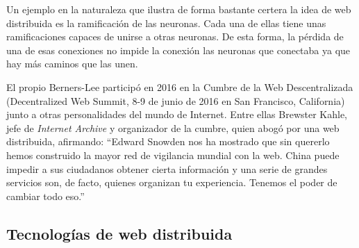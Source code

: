 \documentclass[12pt]{article} %
\begin{document}
Un ejemplo en la naturaleza que ilustra de forma bastante certera la idea de web distribuida es la ramificación de las neuronas. Cada una de ellas tiene unas ramificaciones capaces de unirse a otras neuronas. De esta forma, la pérdida de una de esas conexiones no impide la conexión las neuronas que conectaba ya que hay más caminos que las unen.

El propio Berners-Lee participó en 2016 en la Cumbre de la Web Descentralizada (Decentralized Web Summit, 8-9 de junio de 2016 en San Francisco, California)\cite{decentralized-web-summit} junto a otras personalidades del mundo de Internet. Entre ellas Brewster Kahle, jefe de \textit{Internet Archive} y organizador de la cumbre, quien abogó por una web distribuida, afirmando: ``Edward Snowden nos ha mostrado que sin quererlo hemos construido la mayor red de vigilancia mundial con la web. China puede impedir a sus ciudadanos obtener cierta información y una serie de grandes servicios son, de facto, quienes organizan tu experiencia. Tenemos el poder de cambiar todo eso.''\cite{berners-lee-kahle-summit}

\subsection{Tecnologías de web distribuida} %
\label{sub:tecnologías_de_web_distribuida}
\end{document}
